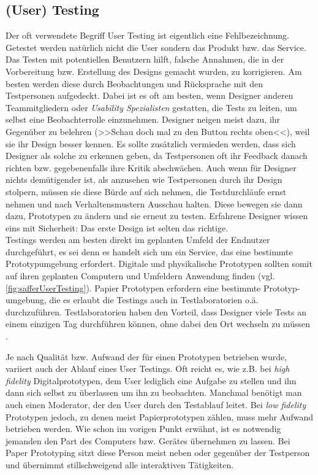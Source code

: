\subsection{(User) Testing}  
Der oft verwendete Begriff User Testing ist eigentlich eine Fehlbezeichnung. Getestet werden natürlich nicht die User sondern das Produkt bzw. das Service. 
Das Testen mit potentiellen Benutzern hilft, falsche Annahmen, die in der Vorbereitung bzw. Erstellung des Designs gemacht wurden, zu korrigieren. Am besten werden diese durch Beobachtungen und Rücksprache mit den Testpersonen aufgedeckt. Dabei ist es oft am besten, wenn Designer anderen Teammitgliedern oder \emph{Usability Spezialisten} gestatten, die Tests zu leiten, um selbst eine Beobachterrolle einzunehmen. Designer neigen meist dazu, ihr Gegenüber zu belehren (>>Schau doch mal zu den Button rechts oben<<), weil sie ihr Design besser kennen. Es sollte zusätzlich vermieden werden, dass sich Designer als solche zu erkennen geben, da Testpersonen oft ihr Feedback danach richten bzw. gegebenenfalls ihre Kritik abschwächen. Auch wenn für Designer nichts demütigender ist, als anzusehen wie Testpersonen durch ihr Design stolpern, müssen sie diese Bürde auf sich nehmen, die Testdurchläufe ernst nehmen und nach Verhaltensmustern Ausschau halten.  Diese bewegen sie dann dazu, Prototypen zu ändern und sie erneut zu testen. Erfahrene Designer wissen eins mit Sicherheit: Das erste Design ist selten das richtige. \\
Testings werden am besten direkt im geplanten Umfeld der Endnutzer durchgeführt, es sei denn es handelt sich um ein Service, das eine bestimmte Prototypumgebung erfordert. Digitale und physikalische Prototypen sollten somit auf ihren geplanten Computern und Umfeldern Anwendung finden (vgl. \autoref{fig:safferUserTesting}). Papier Prototypen erfordern eine bestimmte Prototyp-umgebung, die es erlaubt die Testings auch in Testlaboratorien o.ä. durchzuführen. Testlaboratorien haben den Vorteil, dass Designer viele Tests an einem einzigen Tag durchführen können, ohne dabei den Ort wechseln zu müssen \citep{Saffer:2007}.

\medskip Je nach Qualität bzw. Aufwand der für einen Prototypen betrieben wurde, variiert auch der Ablauf eines User Testings. Oft reicht es, wie z.B. bei \emph{high fidelity} Digitalprototypen, dem User lediglich eine Aufgabe zu stellen und ihn dann sich selbst zu überlassen um ihn zu beobachten. Manchmal benötigt man auch einen Moderator, der den User durch den Testablauf leitet. Bei \emph{low fidelity} Prototypen jedoch, zu denen meist Papierprototypen zählen, muss mehr Aufwand betrieben werden. Wie schon im vorigen Punkt erwähnt, ist es notwendig jemanden den Part des Computers bzw. Gerätes übernehmen zu lassen. Bei Paper Prototyping sitzt diese Person meist neben oder gegenüber der Testperson und übernimmt stillschweigend alle interaktiven Tätigkeiten.

